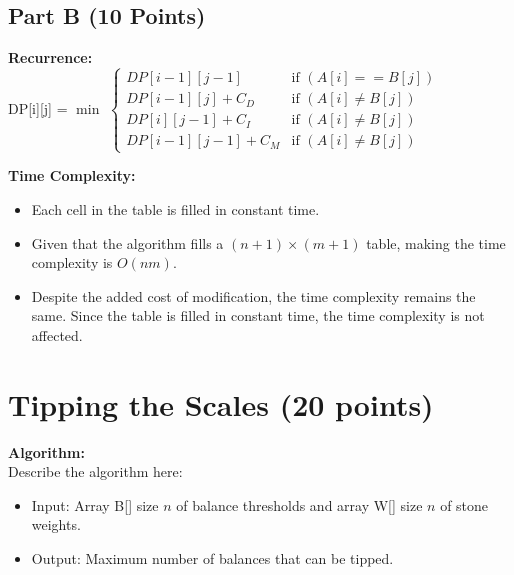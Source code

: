 \documentclass{article}[12pt]
\begin{document}
\subsection{Part B (10 Points)}
\noindent\textbf{Recurrence:} \\
DP[i][j] = $\min$
$\begin{cases}
  DP[i-1][j-1] & \text{if } (A[i] == B[j])\\
  DP[i-1][j] + C_D & \text{if } (A[i] \neq B[j])\\
  DP[i][j-1] + C_I & \text{if } (A[i] \neq B[j])\\
  DP[i-1][j-1] + C_M & \text{if } (A[i] \neq B[j])
\end{cases}$

\noindent\textbf{Time Complexity:} \\
\begin{itemize}
  \item Each cell in the table is filled in constant time.
  \item Given that the algorithm fills a $(n+1) \times (m+1)$ table, 
    making the time complexity is $O(nm)$.
  \item Despite the added cost of modification, the time complexity remains the same.
    Since the table is filled in constant time, the time complexity is not affected.
\end{itemize}

\newpage
\section{Tipping the Scales (20 points)}
\noindent\textbf{Algorithm:} \\
Describe the algorithm here: \\
\begin{itemize}
  \item Input: Array B[] size $n$ of balance thresholds and array W[] size $n$ of stone weights.
  \item Output: Maximum number of balances that can be tipped.
\end{itemize}
\end{document}
